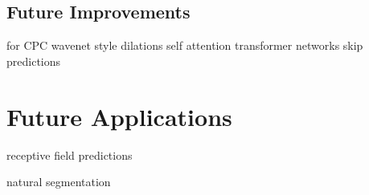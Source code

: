 \subsection{Future Improvements}
 for CPC
wavenet style dilations
self attention
transformer networks
skip predictions

\section{Future Applications}

receptive field predictions

natural segmentation
